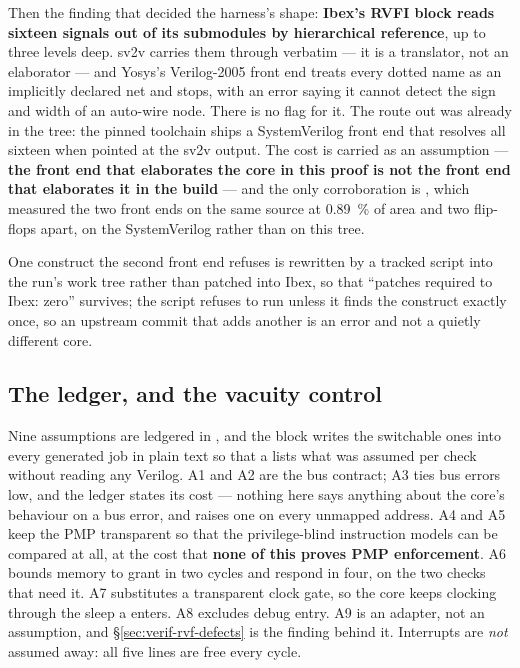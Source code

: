 Then the finding that decided the harness's shape: \textbf{Ibex's RVFI
block reads sixteen signals out of its submodules by hierarchical
reference}, up to three levels deep. sv2v carries
them through verbatim --- it is a translator, not an elaborator --- and
Yosys's Verilog-2005 front end treats every dotted name as an implicitly
declared net and stops, with an error saying it cannot detect the sign
and width of an auto-wire node. There is no flag for it. The route out was
already in the tree: the pinned toolchain ships a SystemVerilog front end
that resolves all sixteen when pointed at the sv2v output. The cost is
carried as an assumption --- \textbf{the front end that elaborates the
core in this proof is not the front end that elaborates it in the build}
--- and the only corroboration is , which measured
the two front ends on the same source at \SI{0.89}{\percent} of area and
two flip-flops apart, on the SystemVerilog rather than on this tree.

One construct the second front end refuses is rewritten by a tracked
script into the run's work tree rather than patched into Ibex, so that
``patches required to Ibex: zero'' survives; the script refuses to run
unless it finds the construct exactly once, so an upstream commit that
adds another is an error and not a quietly different core.

\subsection{The ledger, and the vacuity control}

Nine assumptions are ledgered in , and the
\code{[defines]} block writes the switchable ones into every generated
job in plain text so that a  lists what was assumed per check
without reading any Verilog. A1 and A2 are the bus contract; A3 ties bus
errors low, and the ledger states its cost --- nothing here says anything
about the core's behaviour on a bus error, and  raises
one on every unmapped address. A4 and A5 keep the PMP transparent so that
the privilege-blind instruction models can be compared at all, at the
cost that \textbf{none of this proves PMP enforcement}. A6 bounds memory
to grant in two cycles and respond in four, on the two checks that need
it. A7 substitutes a transparent clock gate, so the core keeps clocking
through the sleep a  enters. A8 excludes debug entry. A9 is an
adapter, not an assumption, and \S\ref{sec:verif-rvf-defects} is the
finding behind it. Interrupts are \emph{not} assumed away: all five lines
are free every cycle.

